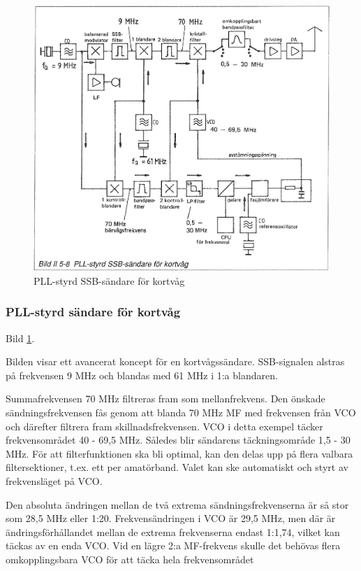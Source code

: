 \begin{figure}
  \includegraphics[width=\textwidth]{images/bild_2_5-08}
  \caption{PLL-styrd SSB-sändare för kortvåg}
  \label{fig:bildII5-8}
\end{figure}

\subsubsection{PLL-styrd sändare för kortvåg}

Bild \ref{fig:bildII5-8}.

Bilden visar ett avancerat koncept för en kortvågssändare.
SSB-signalen alstras på frekvensen 9 MHz och blandas med 61 MHz i 1:a
blandaren.

Summafrekvensen 70 MHz filtreras fram som mellanfrekvens. Den önskade
sändningsfrekvensen fås genom att blanda 70 MHz MF med frekvensen från
VCO och därefter filtrera fram skillnadsfrekvensen.  VCO i detta
exempel täcker frekvensområdet 40 - 69,5 MHz. Således blir sändarens
täckningsområde 1,5 - 30 MHz. För att filterfunktionen ska bli
optimal, kan den delas upp på flera valbara filtersektioner, t.ex. ett
per amatörband. Valet kan ske automatiskt och styrt av frekvensläget
på VCO.

Den absoluta ändringen mellan de två extrema sändningsfrekvenserna är
så stor som 28,5 MHz eller 1:20. Frekvensändringen i VCO är 29,5 MHz,
men där är ändringsförhållandet mellan de extrema frekvenserna endast
1:1,74, vilket kan täckas av en enda VCO. Vid en lägre 2:a MF-frekvens
skulle det behövas flera omkopplingsbara VCO för att täcka hela
frekvensområdet


